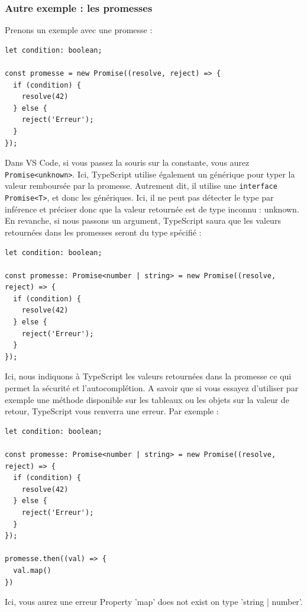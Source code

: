 \documentclass{article}
\begin{document}
\subsubsection{Autre exemple : les promesses}
Prenons un exemple avec une promesse :
\begin{verbatim}
let condition: boolean;

const promesse = new Promise((resolve, reject) => {
  if (condition) {
    resolve(42)
  } else {
    reject('Erreur');
  }
});
\end{verbatim}
Dans {\color{monOrange}VS Code}, si vous passez la souris sur la constante, vous aurez {\tt Promise<unknown>}. Ici, {\color{monOrange}TypeScript} utilise également un générique pour typer la valeur remboursée par la promesse. Autrement dit, il utilise une {\tt interface Promise<T>}, et donc les génériques. Ici, il ne peut pas détecter le type par inférence et préciser donc que la valeur retournée est de type inconnu : {\color{monOrange}unknown}. En revanche, si nous passons un argument, {\color{monOrange}TypeScript} saura que les valeurs retournées dans les promesses seront du type spécifié :
\begin{verbatim}
let condition: boolean;

const promesse: Promise<number | string> = new Promise((resolve, reject) => {
  if (condition) {
    resolve(42)
  } else {
    reject('Erreur');
  }
});
\end{verbatim}
Ici, nous indiquons à {\color{monOrange}TypeScript} les valeurs retournées dans la promesse ce qui permet la sécurité et l'autocomplétion. A savoir que si vous essayez d'utiliser par exemple une méthode disponible sur les tableaux ou les objets sur la valeur de retour, {\color{monOrange}TypeScript} vous renverra une erreur. Par exemple :
\begin{verbatim}
let condition: boolean;

const promesse: Promise<number | string> = new Promise((resolve, reject) => {
  if (condition) {
    resolve(42)
  } else {
    reject('Erreur');
  }
});

promesse.then((val) => {
  val.map()
})
\end{verbatim}
Ici, vous aurez une erreur {\color{red}Property 'map' does not exist on type 'string | number'}.
\end{document}
